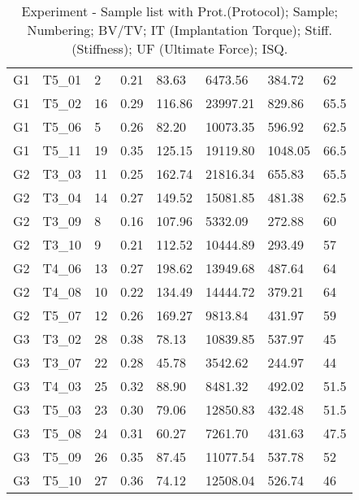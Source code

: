 \documentclass[12pt, a4paper, twoside]{report}
\begin{document}
\begin{table}[H]
\begin{tabular}{l|l|l|l|l|l|l|l}
G1       & T5\_01 & 2 & 0.21          & 83.63             & 6473.56              & 384.72                 & 62          \\
G1       & T5\_02 & 16 & 0.29          & 116.86            & 23997.21             & 829.86                 & 65.5        \\
G1       & T5\_06 & 5 & 0.26          & 82.20             & 10073.35             & 596.92                 & 62.5        \\
G1       & T5\_11 & 19 & 0.35          & 125.15            & 19119.80             & 1048.05                & 66.5        \\
G2       & T3\_03 & 11 & 0.25          & 162.74            & 21816.34             & 655.83                 & 65.5        \\
G2       & T3\_04 & 14 & 0.27          & 149.52            & 15081.85             & 481.38                 & 62.5        \\
G2       & T3\_09 & 8 & 0.16          & 107.96            & 5332.09              & 272.88                 & 60          \\
G2       & T3\_10 & 9 & 0.21          & 112.52            & 10444.89             & 293.49                 & 57          \\
G2       & T4\_06 & 13 & 0.27          & 198.62            & 13949.68             & 487.64                 & 64          \\
G2       & T4\_08 & 10 & 0.22          & 134.49            & 14444.72             & 379.21                 & 64          \\
G2       & T5\_07 & 12 & 0.26          & 169.27            & 9813.84              & 431.97                 & 59          \\
G3       & T3\_02 & 28 & 0.38          & 78.13             & 10839.85             & 537.97                 & 45          \\
G3       & T3\_07 & 22 & 0.28          & 45.78             & 3542.62              & 244.97                 & 44          \\
G3       & T4\_03 & 25 & 0.32          & 88.90             & 8481.32              & 492.02                 & 51.5        \\
G3       & T5\_03 & 23 & 0.30          & 79.06             & 12850.83             & 432.48                 & 51.5        \\
G3       & T5\_08 & 24 & 0.31          & 60.27             & 7261.70              & 431.63                 & 47.5        \\
G3       & T5\_09 & 26 & 0.35          & 87.45             & 11077.54             & 537.78                 & 52          \\
G3       & T5\_10 & 27 & 0.36          & 74.12             & 12508.04             & 526.74                 & 46         
\end{tabular}
\caption{Experiment - Sample list with Prot.(Protocol); Sample; Numbering; BV/TV; IT (Implantation Torque); Stiff. (Stiffness); UF (Ultimate Force); ISQ.}
\label{tab:TabSamples}
\end{table}
\end{document}
